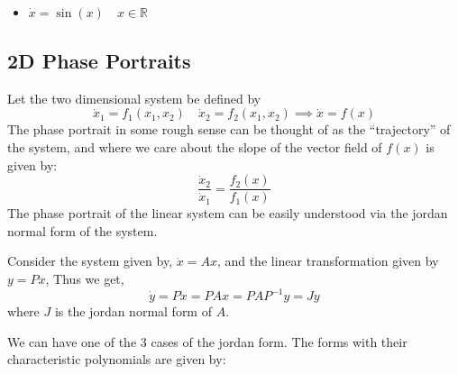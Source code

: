 \begin{example}
\begin{itemize}
\begin{center}
        \end{center}
        \item \(\dot{x} = \sin (x) \quad x \in \mathbb{R}\)
        \begin{center}
        \end{center}
    \end{itemize}
    
\end{example}

\subsection{2D Phase Portraits}
Let the two dimensional system be defined by
\[
    \dot{x}_1 = f_1(x_1, x_2) \quad \dot{x}_2 = f_2(x_1, x_2) \implies \dot{x} = f(x)  
\]
The phase portrait in some rough sense can be thought of as the ``trajectory'' of the system,
and where we care about the slope of the vector field of \(f(x)\) is given by:
\[
    \frac{\dot{x}_2}{\dot{x}_1} = \frac{f_2(x)}{f_1(x)}  
\] 
The phase portrait of the linear system can be easily understood via the jordan normal form
of the system.

Consider the system given by, \(\dot{x} = Ax \), and the linear transformation given by \(y = Px\),
Thus we get,
\[
    \dot{y} = P\dot{x} = PAx = PAP^{-1}y = Jy  
\]  
where \(J\) is the jordan normal form of \(A\).

We can have one of the 3 cases of the jordan form. The forms with their characteristic
polynomials are given by:

